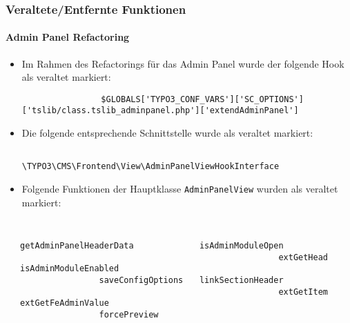 \begin{frame}[fragile]
	\frametitle{Veraltete/Entfernte Funktionen}
	\framesubtitle{Admin Panel Refactoring}

	\lstset{basicstyle=\tiny\ttfamily}

	\begin{itemize}
		\item Im Rahmen des Refactorings für das Admin Panel wurde der folgende Hook
			als veraltet markiert:
			\begin{lstlisting}
				$GLOBALS['TYPO3_CONF_VARS']['SC_OPTIONS']['tslib/class.tslib_adminpanel.php']['extendAdminPanel']
			\end{lstlisting}

		\item Die folgende entsprechende Schnittstelle wurde als veraltet markiert:
			\begin{lstlisting}
				\TYPO3\CMS\Frontend\View\AdminPanelViewHookInterface
			\end{lstlisting}

		\item Folgende Funktionen der Hauptklasse \texttt{AdminPanelView}
			wurden als veraltet markiert:

	\end{itemize}

	\vspace{-0.2cm}

	\begin{columns}[T]
		\begin{column}{.1\textwidth}
		\end{column}
		\begin{column}{.4\textwidth}
			\begin{lstlisting}
				getAdminPanelHeaderData
				isAdminModuleEnabled
				saveConfigOptions
				extGetFeAdminValue
				forcePreview
			\end{lstlisting}
		\end{column}
		\begin{column}{.4\textwidth}
			\begin{lstlisting}
				isAdminModuleOpen
				extGetHead
				linkSectionHeader
				extGetItem
			\end{lstlisting}
		\end{column}
		\begin{column}{.1\textwidth}
		\end{column}
	\end{columns}

\end{frame}

